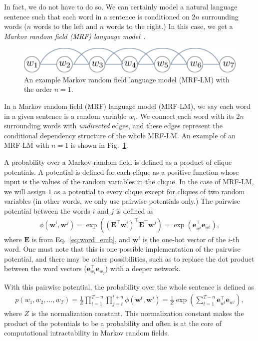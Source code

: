 \documentclass{report}
\newcommand{\vect}[1]{\mathbf{#1}}
\newcommand{\matr}[1]{\mathbf{#1}}
\newcommand{\ve}[0]{\vect{e}}
\newcommand{\vw}[0]{\vect{w}}
\newcommand{\mE}[0]{\matr{E}}
\begin{document}
In fact, we do not have to do so. We can certainly model a natural language
sentence such that each word in a sentence is conditioned on $2n$ surrounding
words ($n$ words to the left and $n$ words to the right.) In this case, we get a
{\em Markov random field (MRF) language model}~\cite{jernite2015fast}.

\begin{figure}[ht]
    \centering
    \includegraphics[width=\textwidth]{figures/mrflm.pdf}
    \caption{An example Markov random field language model (MRF-LM) with the
    order $n=1$.}
    \label{fig:mrf_lm}
\end{figure}

In a Markov random field (MRF) language model (MRF-LM), we say each word in a
given sentence is a random variable $w_i$. We connect each word with its $2n$
surrounding words with {\em undirected} edges, and these edges represent the
conditional dependency structure of the whole MRF-LM. An example of an MRF-LM
with $n=1$ is shown in Fig.~\ref{fig:mrf_lm}.

A probability over a Markov random field is defined as a product of clique
potentials. A potential is defined for each clique as a positive function whose
input is the values of the random variables in the clique. In the case of
MRF-LM, we will assign $1$ as a potential to every clique except for cliques of
two random variables (in other words, we only use pairwise potentials only.) The
pairwise potential between the words $i$ and $j$ is defined as
\begin{align*}
    \phi(\vw^i, \vw^j) = \exp\left( (\mE^\top \vw^{i})^\top  \mE^\top \vw^j\right) = 
    \exp\left( \ve_{w^i}^\top \ve_{w^j} \right),
\end{align*}
where $\mE$ is from Eq.~\eqref{eq:word_emb}, and $\vw^i$ is the one-hot
vector of the $i$-th word. One must note that this is one possible
implementation of the pairwise potential, and there may be other possibilities,
such as to replace the dot product between the word vectors ($\ve_{w_i}^\top
\ve_{w_j}$) with a deeper network.

With this pairwise potential, the probability over the whole sentence is defined
as
\begin{align*}
    p(w_1, w_2, \ldots, w_T) = \frac{1}{Z} \prod_{t=1}^{T-n} \prod_{j=t}^{t+n}
    \phi(\vw^t, \vw^j) = \frac{1}{Z} \exp\left( 
        \sum_{t=1}^{T-n} \ve_{w^t}^\top \ve_{w^j}
    \right),
\end{align*}
where $Z$ is the normalization constant. This normalization constant makes the
product of the potentials to be a probability and often is at the core of
computational intractability in Markov random fields.
\end{document}
